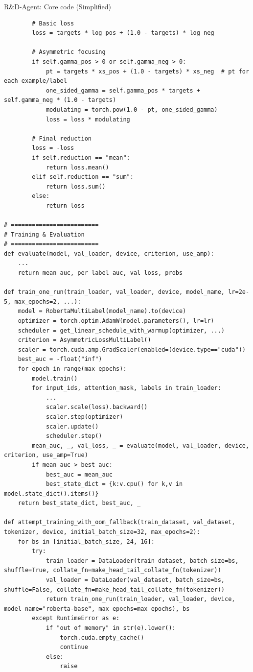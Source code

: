 \begin{codebox}{R\&D-Agent: Core code (Simplified)}
\begin{verbatim}
        # Basic loss
        loss = targets * log_pos + (1.0 - targets) * log_neg

        # Asymmetric focusing
        if self.gamma_pos > 0 or self.gamma_neg > 0:
            pt = targets * xs_pos + (1.0 - targets) * xs_neg  # pt for each example/label
            one_sided_gamma = self.gamma_pos * targets + self.gamma_neg * (1.0 - targets)
            modulating = torch.pow(1.0 - pt, one_sided_gamma)
            loss = loss * modulating

        # Final reduction
        loss = -loss
        if self.reduction == "mean":
            return loss.mean()
        elif self.reduction == "sum":
            return loss.sum()
        else:
            return loss

# =========================
# Training & Evaluation
# =========================
def evaluate(model, val_loader, device, criterion, use_amp):
    ...
    return mean_auc, per_label_auc, val_loss, probs

def train_one_run(train_loader, val_loader, device, model_name, lr=2e-5, max_epochs=2, ...):
    model = RobertaMultiLabel(model_name).to(device)
    optimizer = torch.optim.AdamW(model.parameters(), lr=lr)
    scheduler = get_linear_schedule_with_warmup(optimizer, ...)
    criterion = AsymmetricLossMultiLabel()
    scaler = torch.cuda.amp.GradScaler(enabled=(device.type=="cuda"))
    best_auc = -float("inf")
    for epoch in range(max_epochs):
        model.train()
        for input_ids, attention_mask, labels in train_loader:
            ...
            scaler.scale(loss).backward()
            scaler.step(optimizer)
            scaler.update()
            scheduler.step()
        mean_auc, _, val_loss, _ = evaluate(model, val_loader, device, criterion, use_amp=True)
        if mean_auc > best_auc:
            best_auc = mean_auc
            best_state_dict = {k:v.cpu() for k,v in model.state_dict().items()}
    return best_state_dict, best_auc, _

def attempt_training_with_oom_fallback(train_dataset, val_dataset, tokenizer, device, initial_batch_size=32, max_epochs=2):
    for bs in [initial_batch_size, 24, 16]:
        try:
            train_loader = DataLoader(train_dataset, batch_size=bs, shuffle=True, collate_fn=make_head_tail_collate_fn(tokenizer))
            val_loader = DataLoader(val_dataset, batch_size=bs, shuffle=False, collate_fn=make_head_tail_collate_fn(tokenizer))
            return train_one_run(train_loader, val_loader, device, model_name="roberta-base", max_epochs=max_epochs), bs
        except RuntimeError as e:
            if "out of memory" in str(e).lower():
                torch.cuda.empty_cache()
                continue
            else:
                raise


\end{verbatim}
\end{codebox}
